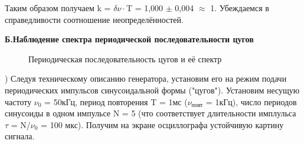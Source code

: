 \documentclass[a4paper,12pt]{article}
\begin{document}

Таким образом получаем k = $\delta\nu\cdot$T = 1,000 $\pm$ 0,004 $\approx$ 1. Убеждаемся в справедливости соотношение неопределённостей. 

\textbf{Б.Наблюдение спектра периодической последовательности цугов}

\begin{figure}
\caption{Периодическая последовательность цугов и её спектр}
\end{figure}

) Следуя техническому описанию генератора, установим его на режим подачи периодических импульсов синусоидальной формы ("цугов"). Установим несущую частоту $\nu_0$ = 50кГц, период повторения T = 1мс ($\nu_{\text{повт}}$ = 1кГц), число периодов синусоиды в одном импульсе N = 5 (что соответствует длительности имплульса $\tau$ = N/$\nu_0$ = 100 мкс). Получим на экране осциллографа устойчивую картину сигнала. 
\end{document}
